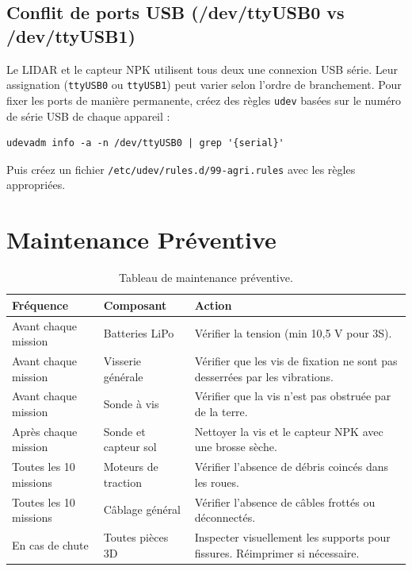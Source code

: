\documentclass [12pt, a4paper]{article}
\begin{document}
\subsection{Conflit de ports USB (/dev/ttyUSB0 vs /dev/ttyUSB1)}
Le LIDAR et le capteur NPK utilisent tous deux une connexion USB série. Leur assignation (\texttt{ttyUSB0} ou \texttt{ttyUSB1}) peut varier selon l'ordre de branchement. Pour fixer les ports de manière permanente, créez des règles \texttt{udev} basées sur le numéro de série USB de chaque appareil :
\begin{verbatim}
udevadm info -a -n /dev/ttyUSB0 | grep '{serial}'
\end{verbatim}
Puis créez un fichier \texttt{/etc/udev/rules.d/99-agri.rules} avec les règles appropriées.

\section{Maintenance Préventive}

\begin{table}[H]
\centering
\begin{tabularx}{\textwidth}{llX}
\toprule
\textbf{Fréquence} & \textbf{Composant} & \textbf{Action} \\
\midrule
Avant chaque mission & Batteries LiPo & Vérifier la tension (min 10,5 V pour 3S). \\
Avant chaque mission & Visserie générale & Vérifier que les vis de fixation ne sont pas desserrées par les vibrations. \\
Avant chaque mission & Sonde à vis & Vérifier que la vis n'est pas obstruée par de la terre. \\
Après chaque mission & Sonde et capteur sol & Nettoyer la vis et le capteur NPK avec une brosse sèche. \\
Toutes les 10 missions & Moteurs de traction & Vérifier l'absence de débris coincés dans les roues. \\
Toutes les 10 missions & Câblage général & Vérifier l'absence de câbles frottés ou déconnectés. \\
En cas de chute & Toutes pièces 3D & Inspecter visuellement les supports pour fissures. Réimprimer si nécessaire. \\
\bottomrule
\end{tabularx}
\caption{Tableau de maintenance préventive.}
\end{table}
\end{document}
